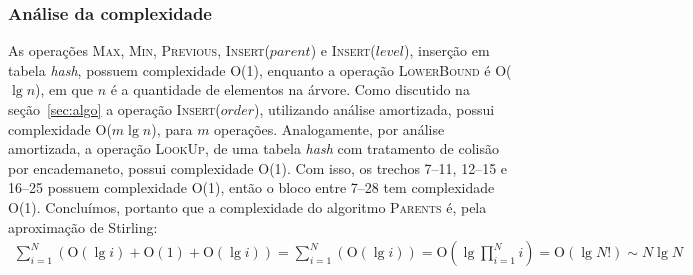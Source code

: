 \subsubsection{Análise da complexidade}
As operações \textsc{Max}, \textsc{Min}, \textsc{Previous},
\textsc{Insert}($parent$) e \textsc{Insert}($level$), inserção em tabela
\textit{hash}, possuem complexidade O(1), enquanto a operação
\textsc{LowerBound} é O($\lg n$), em que $n$ é a quantidade de elementos na árvore. Como discutido na seção~\ref{sec:algo}
a operação \textsc{Insert}($order$), utilizando análise amortizada, possui
complexidade O($m \lg n$), para $m$ operações. Analogamente, por análise amortizada, a operação
\textsc{LookUp}, de uma tabela \textit{hash} com tratamento de colisão por
encademaneto, possui complexidade O(1). Com isso, os trechos 7--11, 12--15 e
16--25 possuem complexidade O(1), então o bloco entre 7--28 tem complexidade O(1). Concluímos,
portanto que a complexidade do algoritmo \textsc{Parents} é, pela aproximação de
Stirling:
\begin{align*}
  \sum_{i = 1}^{N}(\text{O}(\lg i) + \text{O}(1) + \text{O}(\lg i)) = \sum_{i = 1}^{N}(\text{O}(\lg i)) = \text{O}(\lg \prod_{i = 1}^{N} i) = \text{O}(\lg N!) \sim N \lg N
\end{align*}